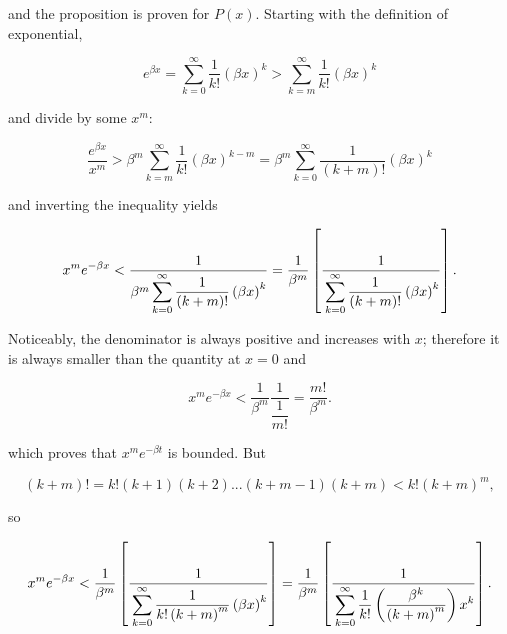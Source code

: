 	\noindent and the proposition is proven for $P(x)$. Starting with the definition of exponential,

\begin{equation} e^{\beta x} = \sum_{k=0}^\infty \dfrac{1}{k!} \left(\beta x\right)^k > \sum_{k=m}^\infty \dfrac{1}{k!} \left(\beta x\right)^k \end{equation}

	\noindent and divide by some $x^m$:

\begin{equation} \dfrac{e^{\beta x}}{x^m} > \beta^m \sum_{k=m}^\infty \dfrac{1}{k!} \left(\beta x\right)^{k-m} = \beta^m \sum_{k=0}^\infty \dfrac{1}{(k+m)!} \left(\beta x\right)^{k}\end{equation}

	\noindent and inverting the inequality yields

\begin{equation} x^m e^{-\beta x} < \dfrac{1}{\raisebox{1mm}[3mm][0mm]{} \beta^m \displaystyle\sum_{k=0}^\infty \dfrac{1}{(k+m)!} \left(\beta x\right)^{k} } = \dfrac{1}{\beta^m} \left[\dfrac{1}{\raisebox{1mm}[3mm][0mm]{} \displaystyle\sum_{k=0}^\infty \dfrac{1}{(k+m)!} \left(\beta x\right)^{k} }\right]. \end{equation}

	Noticeably, the denominator is always positive and increases with $x$; therefore it is always smaller than the quantity at $x = 0$ and

\begin{equation} x^m e^{-\beta x} < \dfrac{1}{\beta^m} \dfrac{1}{\dfrac{1}{m!}} = \dfrac{m!}{\beta^m}. \label{eq:boudned_exp_poly}\end{equation}

	\noindent which proves that $x^me^{-\beta t}$ is bounded. But 

\begin{equation} (k+m)! = k! (k+1)(k+2)...(k+m-1)(k+m) < k! (k+m)^m, \end{equation}

	\noindent so 

\begin{equation} x^m e^{-\beta x} < \dfrac{1}{\beta^m} \left[\dfrac{1}{\raisebox{1mm}[3mm][0mm]{} \displaystyle\sum_{k=0}^\infty \dfrac{1}{k! \left(k+m\right)^m} \left(\beta x\right)^{k} }\right] = \dfrac{1}{\beta^m} \left[\dfrac{1}{\raisebox{1mm}[3mm][0mm]{} \displaystyle\sum_{k=0}^\infty \dfrac{1}{k!}\left(\dfrac{\beta^k}{ \left(k+m\right)^m} \right) x^{k} }\right]. \end{equation}

